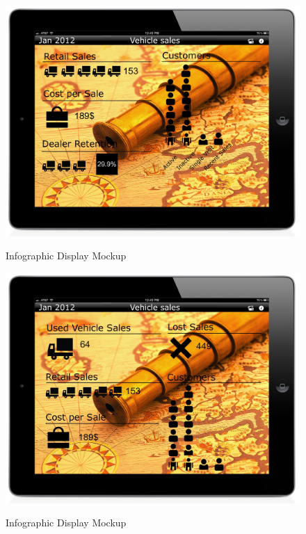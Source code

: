 \documentclass[11pt,a4paper,oneside]{article}
\begin{document}
\begin{figure}[!]
\caption{Infographic Display Mockup\label{mockup-infographic-display-1}}
\includegraphics[width=1\textwidth]{images/screen5.jpg}\\
\end{figure}

\begin{figure}[!]
\caption{Infographic Display Mockup\label{mockup-infographic-display-2}}
\includegraphics[width=1\textwidth]{images/screen3.jpg}\\
\end{figure}
\end{document}
